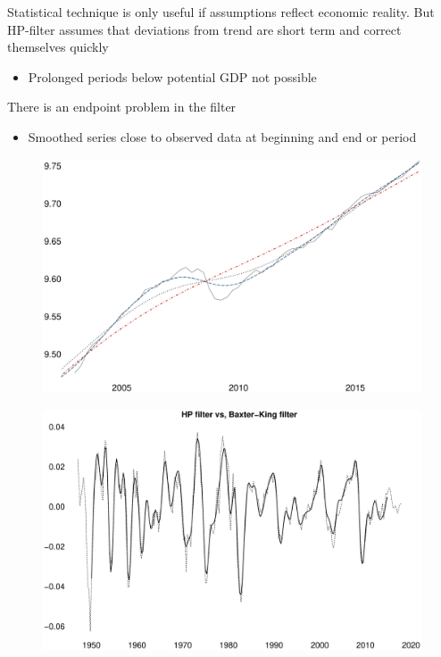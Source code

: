 \documentclass{beamer}
\begin{document}
\begin{frame}
  Statistical technique is only useful if assumptions reflect economic reality.
  But HP-filter assumes that deviations from trend are short term and correct themselves quickly
  \begin{itemize}
    \item Prolonged periods below potential GDP not possible
  \end{itemize}
  \medskip
  There is an endpoint problem in the filter
  \begin{itemize}
    \item Smoothed series close to observed data at beginning and end or period
  \end{itemize}  
\end{frame}

\begin{frame}
  \begin{figure}
     \includegraphics[scale=.3]{hp_lambda.eps}
  \end{figure}
\end{frame}

\begin{frame}
  \begin{figure}
    \includegraphics[scale=.3]{baxter_king.eps}
  \end{figure}
\end{frame}
\end{document}
